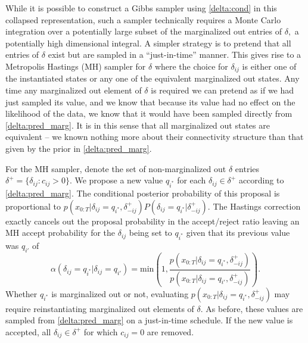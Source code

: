 While it is possible to construct a Gibbs sampler using \eqref{delta:cond} in this collapsed representation, such a sampler technically requires a Monte Carlo integration over a potentially large subset of the marginalized out entries of $\delta,$ a potentially high dimensional integral.  A simpler strategy is to pretend that all entries of $\delta$ exist but are sampled in a ``just-in-time'' manner.  
This gives rise to a Metropolis Hastings (MH) sampler for $\delta$ where the choice for $\delta_{ij}$ is either one of the instantiated states or any one of the equivalent marginalized out states.   Any time any marginalized out element of $\delta$ is required we can pretend as if we had just sampled its value, and we know that because its value had no effect on the likelihood of the data, we know that it would have been sampled directly from \eqref{delta:pred_marg}.  It is in this sense that all marginalized out states are equivalent -- we known nothing more about their connectivity structure than that given by the prior in \eqref{delta:pred_marg}.

   For the MH sampler, denote the set of non-marginalized out $\delta$ entries $\delta^+ = \{ \delta_{ij} : c_{ij} > 0\}.$ We propose a new value $q_{i^*}$ for each $\delta_{ij}\in\delta^+$ according to \eqref{delta:pred_marg}.  The conditional posterior probability of this proposal is proportional to $p(x_{0:T}|\delta_{ij}=q_{i^*},\delta^+_{-ij})P(\delta_{ij} = q_{i^*}|\delta^+_{-ij})$.  The Hastings correction exactly cancels out the proposal probability in the accept/reject ratio leaving an MH accept probability for the $\delta_{ij}$ being set to $q_{i^*}$ given that its previous value was $q_{i'}$ of
%
\begin{equation}
 \alpha(\delta_{ij}=q_{i^*} | \delta_{ij}=q_{i'}) =  \mathrm{min}\left(1,\frac{p(x_{0:T}|\delta_{ij}=q_{i^*},\delta_{-ij}^+)}{p(x_{0:T}|\delta_{ij}=q_{i'},\delta_{-ij}^+)}\right). \label{delta:mh}
\end{equation}
%
Whether $q_{i^*}$ is marginalized out or not, evaluating $p(x_{0:T}|\delta_{ij}=q_{i^*},\delta_{-ij}^+)$ may require reinstantiating marginalized out elements of $\delta$.  As before, these values are sampled from \eqref{delta:pred_marg} on a just-in-time schedule.  If the new value is accepted, all $\delta_{ij} \in \delta^+$ for which $c_{ij} = 0$ are removed.

